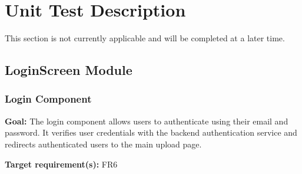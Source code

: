 \documentclass[12pt, titlepage]{article}
\begin{document}
\section{Unit Test Description}
\label{Unit Test Desc}
This section is not currently applicable and will be completed at a later time. 

\subsection{LoginScreen Module}

\subsubsection{Login Component}

\textbf{Goal:}
The login component allows users to authenticate using their email and password.
It verifies user credentials with the backend authentication service and redirects
authenticated users to the main upload page.

\textbf{Target requirement(s):} FR6
\end{document}
